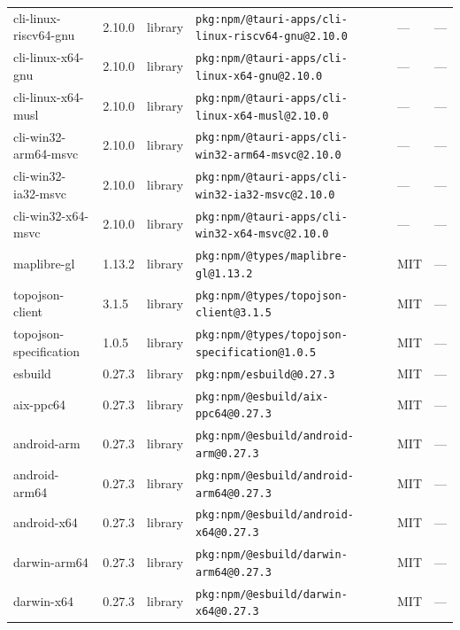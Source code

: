 \documentclass[11pt,a4paper]{article}
\begin{document}
\begin{longtable}{|p{4cm}|p{2cm}|p{1.6cm}|p{5cm}|p{1.5cm}|p{3.5cm}|}
\raggedright cli-linux-riscv64-gnu & 2.10.0 & library & \small\texttt{pkg:npm/@tauri-apps/cli-linux-riscv64-gnu@2.10.0} & — & \small — \\
\raggedright cli-linux-x64-gnu & 2.10.0 & library & \small\texttt{pkg:npm/@tauri-apps/cli-linux-x64-gnu@2.10.0} & — & \small — \\
\raggedright cli-linux-x64-musl & 2.10.0 & library & \small\texttt{pkg:npm/@tauri-apps/cli-linux-x64-musl@2.10.0} & — & \small — \\
\raggedright cli-win32-arm64-msvc & 2.10.0 & library & \small\texttt{pkg:npm/@tauri-apps/cli-win32-arm64-msvc@2.10.0} & — & \small — \\
\raggedright cli-win32-ia32-msvc & 2.10.0 & library & \small\texttt{pkg:npm/@tauri-apps/cli-win32-ia32-msvc@2.10.0} & — & \small — \\
\raggedright cli-win32-x64-msvc & 2.10.0 & library & \small\texttt{pkg:npm/@tauri-apps/cli-win32-x64-msvc@2.10.0} & — & \small — \\
\raggedright maplibre-gl & 1.13.2 & library & \small\texttt{pkg:npm/@types/maplibre-gl@1.13.2} & MIT & \small — \\
\raggedright topojson-client & 3.1.5 & library & \small\texttt{pkg:npm/@types/topojson-client@3.1.5} & MIT & \small — \\
\raggedright topojson-specification & 1.0.5 & library & \small\texttt{pkg:npm/@types/topojson-specification@1.0.5} & MIT & \small — \\
\raggedright esbuild & 0.27.3 & library & \small\texttt{pkg:npm/esbuild@0.27.3} & MIT & \small — \\
\raggedright aix-ppc64 & 0.27.3 & library & \small\texttt{pkg:npm/@esbuild/aix-ppc64@0.27.3} & MIT & \small — \\
\raggedright android-arm & 0.27.3 & library & \small\texttt{pkg:npm/@esbuild/android-arm@0.27.3} & MIT & \small — \\
\raggedright android-arm64 & 0.27.3 & library & \small\texttt{pkg:npm/@esbuild/android-arm64@0.27.3} & MIT & \small — \\
\raggedright android-x64 & 0.27.3 & library & \small\texttt{pkg:npm/@esbuild/android-x64@0.27.3} & MIT & \small — \\
\raggedright darwin-arm64 & 0.27.3 & library & \small\texttt{pkg:npm/@esbuild/darwin-arm64@0.27.3} & MIT & \small — \\
\raggedright darwin-x64 & 0.27.3 & library & \small\texttt{pkg:npm/@esbuild/darwin-x64@0.27.3} & MIT & \small — \\

\end{longtable}
\end{document}
